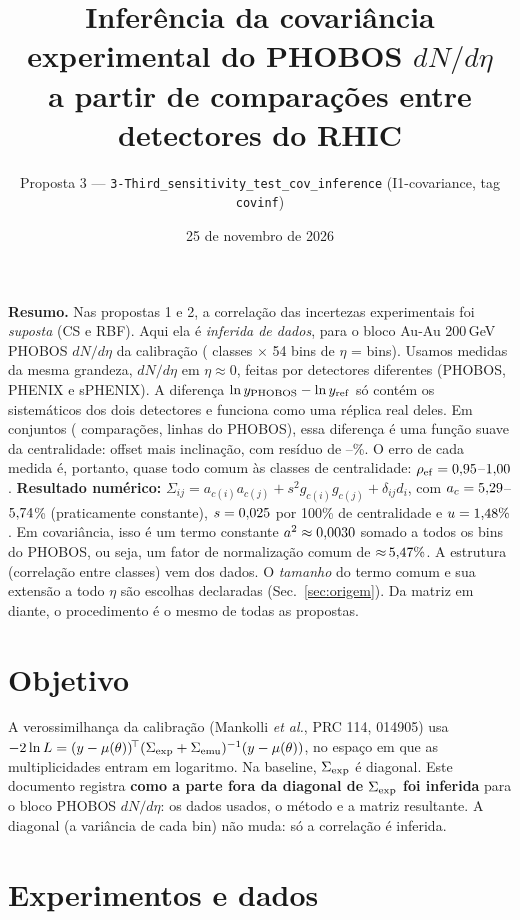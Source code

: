 \documentclass[11pt,a4paper]{article}
\title{Inferência da covariância experimental do PHOBOS $dN/d\eta$\\
\large a partir de comparações entre detectores do RHIC}
\date{25 de novembro de 2026}
\author{Proposta 3 --- \texttt{3-Third\_sensitivity\_test\_cov\_inference} \quad (I1-covariance, tag \texttt{covinf})}
\newcommand{\caixa}[2]{\par\noindent\colorbox{#1}{\parbox{\dimexpr\linewidth-2\fboxsep}{#2}}\par}
\begin{document}
\maketitle
\vspace{-1.5em}

\caixa{blue!6}{\textbf{Resumo.} Nas propostas 1 e 2, a correlação das incertezas experimentais foi \emph{suposta}
(CS e RBF). Aqui ela é \emph{inferida de dados}, para o bloco Au-Au 200\,GeV PHOBOS $dN/d\eta$ da calibração
(\valNclasses{} classes $\times$ 54 bins de $\eta$ = \valNbins{} bins). Usamos medidas da mesma grandeza, $dN/d\eta$ em
$\eta\approx0$, feitas por detectores diferentes (PHOBOS, PHENIX e sPHENIX). A diferença $\ln y_{\rm PHOBOS}-\ln y_{\rm ref}$ só contém os
sistemáticos dos dois detectores e funciona como uma réplica real deles. Em \valNsets{} conjuntos (\valNcmp{} comparações,
\valNphobos{} linhas do PHOBOS), essa diferença é uma função suave da centralidade: offset mais inclinação, com resíduo de
\valResMin--\valResMax\%. O erro de cada medida é, portanto, quase todo comum às classes de centralidade:
$\rho_{\rm ef}=0{,}95$--$1{,}00$.
\textbf{Resultado numérico:} $\Sigma_{ij}=a_{c(i)}a_{c(j)}+s^2g_{c(i)}g_{c(j)}+\delta_{ij}d_i$, com $a_c=5{,}29$--$5{,}74$\%
(praticamente constante), $s=0{,}025$ por 100\% de centralidade e $u=1{,}48\%$. Em covariância, isso é um termo constante
$a^2\approx0{,}0030$ somado a todos os bins do PHOBOS, ou seja, um fator de normalização comum de ${\approx}\,5{,}47\%$.
A estrutura (correlação entre classes) vem dos dados. O \emph{tamanho} do termo comum e sua extensão a todo $\eta$ são
escolhas declaradas (Sec.~\ref{sec:origem}). Da matriz em diante, o procedimento é o mesmo de todas as propostas.}

\section{Objetivo}
A verossimilhança da calibração (Mankolli \emph{et al.}, PRC 114, 014905) usa
$-2\ln L=(y-\mu(\theta))^{\!\top}(\Sigma_{\rm exp}+\Sigma_{\rm emu})^{-1}(y-\mu(\theta))$, no espaço em que as multiplicidades
entram em logaritmo. Na baseline, $\Sigma_{\rm exp}$ é diagonal. Este documento registra \textbf{como a parte fora da diagonal
de $\Sigma_{\rm exp}$ foi inferida} para o bloco PHOBOS $dN/d\eta$: os dados usados, o método e a matriz resultante. A
diagonal (a variância de cada bin) não muda: só a correlação é inferida.

\section{Experimentos e dados}
\end{document}
